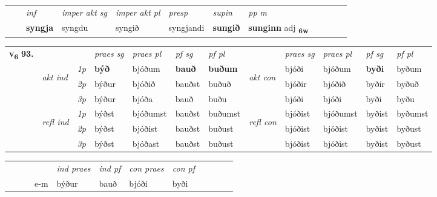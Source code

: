 \begin{tabular}{llllllllllll}
 & & \textit{inf} & \textit{imper akt sg} & \textit{imper akt pl}   & \textit{presp} & \textit{supin}  & \textit{pp m}     \\*
  & & \textbf{syngja} & syngdu  & syngið   & syngjandi &  \textbf{sungið}  & \textbf{sunginn} adj \textbf{\textsubscript{6w}} \\*
\cmidrule{1-12}
\end{tabular}



\begin{tabular}{llllllllllll} \toprule
\multirow{4}{*}{{{\textbf{v{\textsubscript{6}}} \Large{\textbf{93.}}}}}  & &   &  \textit{praes sg}  & \textit{praes pl}  &\textit{ pf sg} & \textit{pf pl} &  &  \textit{praes sg}  & \textit{praes pl}  & \textit{pf sg} & \textit{pf pl } \\*
	\cmidrule{4-7} \cmidrule{9-12}
 & \multirow{3}{*}{\begin{turn}{90}\textit{akt ind}\end{turn}} & {\textit{1p}} & \textbf{býð} & bjóðum    & \textbf{bauð} & \textbf{buðum} & \multirow{3}{*}{\begin{turn}{90}\textit{akt con}\end{turn}} &bjóði & bjóðum & \textbf{byði} & byðum\\*
& &  {\textit{2p}} &  býður  & bjóðið   & bauðst & buðuð & & bjóðir & bjóðið & byðir & byðuð \\*
& &  {\textit{3p}} & býður & bjóða   & bauð & buðu & & bjóði & bjóði& byði & byðu  \\*
\cmidrule{4-7} \cmidrule{9-12}
 &\multirow{3}{*}{\begin{turn}{90}\textit{refl ind}\end{turn}} & {\textit{1p}} & býðst & bjóðumst    & bauðst & buðumst & \multirow{3}{*}{\begin{turn}{90}\textit{refl con}\end{turn}}  &bjóðist & bjóðumst & byðist & byðumst\\*
 &&  {\textit{2p}} &  býðst  & bjóðist   & bauðst & buðust & &bjóðist & bjóðist & byðist & byðust \\*
& &  {\textit{3p}} & býðst & bjóðast   & bauðst & buðust & & bjóðist & bjóðist& byðist & byðust  \\*
\cmidrule{4-7} \cmidrule{9-12}
\end{tabular}


\begin{tabular}{llllllllllll}
 & &  & &  \textit{ind praes} & \textit{ind pf} & \textit{con praes} & \textit{con pf} \\*
&  & & e-m & býður & bauð & bjóði & byði \\*
\cmidrule{5-9}
\end{tabular}


